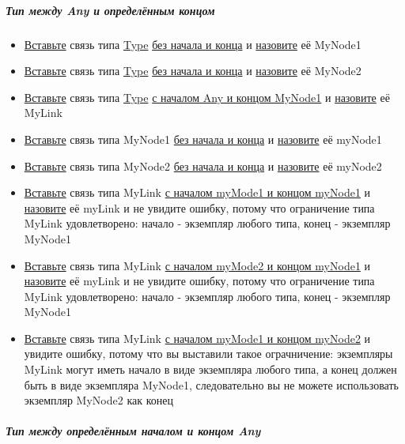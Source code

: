 \documentclass{article}
\begin{document}
\subparagraph{Тип между Any и определённым концом}
\begin{itemize}
  \item \hyperlink{DeepCase.InsertLink.Def}{Вставьте} связь типа \hyperlink{type.Def}{Type} \hyperlink{FAQ.HowToInsertLinkWithoutFromAndTo}{без начала и конца} и \hyperlink{FAQ.HowToSetName}{назовите} её MyNode1
  \item \hyperlink{DeepCase.InsertLink.Def}{Вставьте} связь типа \hyperlink{type.Def}{Type} \hyperlink{FAQ.HowToInsertLinkWithoutFromAndTo}{без начала и конца} и \hyperlink{FAQ.HowToSetName}{назовите} её MyNode2
  \item \hyperlink{DeepCase.InsertLink.Def}{Вставьте} связь типа \hyperlink{type.Def}{Type} \hyperlink{FAQ.HowToInsertLinkWithFromAndTo}{с началом Any и концом MyNode1} и \hyperlink{FAQ.HowToSetName}{назовите} её MyLink
  \item \hyperlink{DeepCase.InsertLink.Def}{Вставьте} связь типа MyNode1 \hyperlink{FAQ.HowToInsertLinkWithoutFromAndTo}{без начала и конца} и \hyperlink{FAQ.HowToSetName}{назовите} её myNode1
  \item \hyperlink{DeepCase.InsertLink.Def}{Вставьте} связь типа MyNode2 \hyperlink{FAQ.HowToInsertLinkWithoutFromAndTo}{без начала и конца} и \hyperlink{FAQ.HowToSetName}{назовите} её myNode2
  \item \hyperlink{DeepCase.InsertLink.Def}{Вставьте} связь типа MyLink \hyperlink{FAQ.HowToInsertLinkWithFromAndTo}{с началом myMode1 и концом myNode1} и \hyperlink{FAQ.HowToSetName}{назовите} её myLink и не увидите ошибку, потому что ограничение типа MyLink удовлетворено: начало - экземпляр любого типа, конец - экземпляр MyNode1
  \item \hyperlink{DeepCase.InsertLink.Def}{Вставьте} связь типа MyLink \hyperlink{FAQ.HowToInsertLinkWithFromAndTo}{с началом myMode2 и концом myNode1} и \hyperlink{FAQ.HowToSetName}{назовите} её myLink и не увидите ошибку, потому что ограничение типа MyLink удовлетворено: начало - экземпляр любого типа, конец - экземпляр MyNode1
  \item \hyperlink{DeepCase.InsertLink.Def}{Вставьте} связь типа MyLink \hyperlink{FAQ.HowToInsertLinkWithFromAndTo}{с началом myMode1 и концом myNode2} и увидите ошибку, потому что вы выставили такое ограчничение: экземпляры MyLink могут иметь начало в виде экземпляра любого типа, а конец должен быть в виде экземпляра MyNode1, следовательно вы не можете использовать экземпляр MyNode2 как конец
\end{itemize}
\subparagraph{Тип между определённым началом и концом Any}
\end{document}
